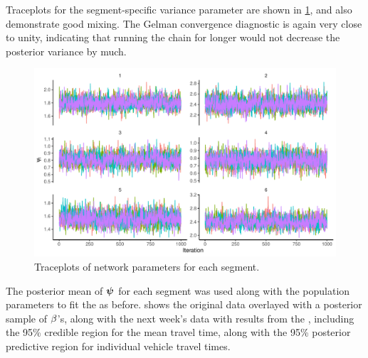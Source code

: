 Traceplots for the segment-specific variance parameter are shown in \cref{fig:nw_model_n2_diag_2}, and also demonstrate good mixing. The Gelman convergence diagnostic is again very close to unity, indicating that running the chain for longer would not decrease the posterior variance by much.



\begin{knitrout}\small
{}\color{fgcolor}\begin{figure}

{\centering \includegraphics[width=\textwidth]{figure/nw_model_n2_diag_2-1} 

}

\caption[Traceplots of network parameters for each segment]{Traceplots of network parameters for each segment.}\label{fig:nw_model_n2_diag_2}
\end{figure}


\end{knitrout}


The posterior mean of $\mathbf{\boldsymbol{\psi}}$ for each segment was used along with the population parameters to fit the \kf{} as before.  shows the original data overlayed with a posterior sample of $\beta$'s, along with the next week's data with results from the \kf{}, including the 95\% credible region for the mean travel time, along with the 95\% posterior predictive region for individual vehicle travel times.








